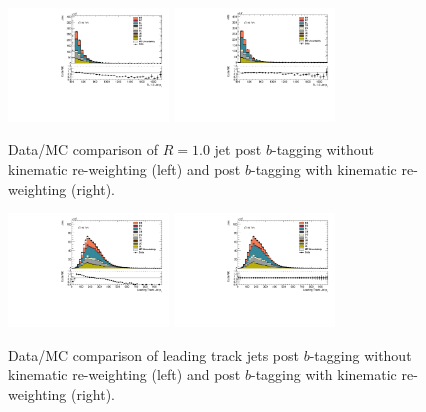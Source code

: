 \begin{figure}[htbp]
  \centering
 \includegraphics[width=0.38\textwidth]{figures/gbb/LargeRJet_pT_PreReweight.pdf}
 \includegraphics[width=0.38\textwidth]{figures/gbb/LargeRJet_pT_Reweight.pdf}
\caption{Data/MC comparison of $R=1.0$ jet post $b$-tagging without kinematic re-weighting (left) and post $b$-tagging with kinematic re-weighting (right).}%
  \label{fig:gbb-pT_largeR}
\end{figure}


\begin{figure}[htbp]
  \centering
 \includegraphics[width=0.38\textwidth]{figures/gbb/LeadTrkJet_pT_PreReweight.pdf}
 \includegraphics[width=0.38\textwidth]{figures/gbb/LeadTrkJet_pT_Reweight.pdf}
\caption{Data/MC comparison of leading track jets \pt post $b$-tagging without kinematic re-weighting (left) and post $b$-tagging with kinematic re-weighting (right).} %
  \label{fig:gbb-pT_leadtrkjets}
\end{figure}


